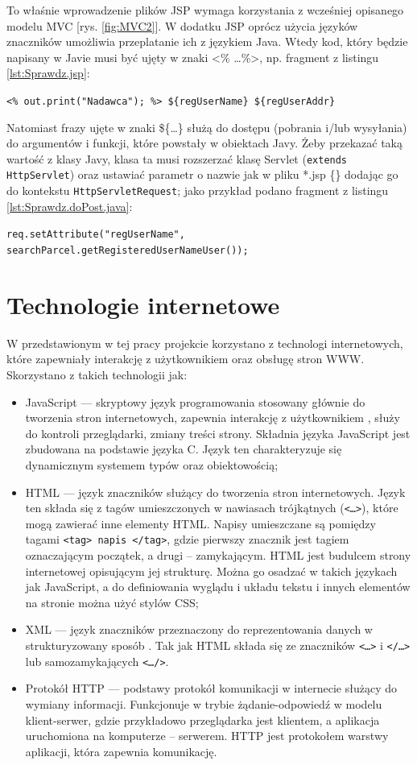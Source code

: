 \documentclass[eng,printmode,oneside]{mgr}
\begin{document}
To właśnie wprowadzenie plików JSP wymaga korzystania z wcześniej
opisanego modelu MVC [rys. \ref{fig:MVC2}]. W dodatku JSP oprócz użycia języków
znaczników umożliwia przeplatanie ich z językiem Java. Wtedy kod, który będzie
napisany w Javie musi być ujęty w znaki <\% \ldots \%>, np. fragment z listingu
\ref{lst:Sprawdz.jsp}:

\texttt{<\% out.print("Nadawca"); \%> \$\{regUserName\}
\$\{regUserAddr\}}

Natomiast frazy ujęte w znaki \$\{\ldots\} służą do dostępu (pobrania
i/lub wysyłania) do argumentów i funkcji, które powstały w obiektach Javy. Żeby
przekazać taką wartość z klasy Javy, klasa ta musi rozszerzać klasę Servlet
(\texttt{extends HttpServlet}) oraz ustawiać parametr o nazwie jak w pliku *.jsp
\{\} dodając go do kontekstu \texttt{HttpServletRequest}; jako przykład podano
fragment z listingu \ref{lst:Sprawdz.doPost.java}:

\texttt{req.setAttribute("regUserName",
						searchParcel.getRegisteredUserNameUser());}

\section{Technologie internetowe}

W przedstawionym w tej pracy projekcie korzystano z technologi internetowych,
które zapewniały interakcję z użytkownikiem oraz obsługę stron WWW. Skorzystano
z takich technologii jak:
\begin{itemize}
  \item JavaScript --- skryptowy język programowania stosowany głównie do
  tworzenia stron internetowych, zapewnia interakcję z
  użytkownikiem \cite{javascript.dev}, służy do kontroli przeglądarki, zmiany
  treści strony. Składnia języka JavaScript jest zbudowana na podstawie języka
  C. Język ten charakteryzuje się dynamicznym systemem typów oraz obiektowością;
  \item HTML --- język znaczników służący do tworzenia stron
  internetowych. Język ten składa się z tagów umieszczonych w
  nawiasach trójkątnych (\texttt{<\ldots>}), które mogą zawierać inne
  elementy HTML. Napisy umieszczane są pomiędzy tagami \texttt{<tag> napis
  </tag>}, gdzie pierwszy znacznik jest tagiem oznaczającym początek, a drugi -- zamykającym.
  HTML jest budulcem strony internetowej opisującym jej strukturę.
  Można go osadzać w takich językach jak JavaScript, a do definiowania wyglądu i
  układu tekstu i innych elementów na stronie można użyć stylów CSS;
  \item XML --- język znaczników przeznaczony do reprezentowania danych w
  strukturyzowany sposób \cite{xml.wiki}. Tak jak HTML składa się ze znaczników
  \texttt{<\ldots>} i \texttt{</\ldots>} lub samozamykających
  \texttt{<\ldots/>}.
  \item Protokół HTTP --- podstawy protokół komunikacji w internecie służący
  do wymiany informacji. Funkcjonuje w trybie żądanie-odpowiedź w modelu
  klient-serwer, gdzie przykładowo przeglądarka jest klientem, a aplikacja
  uruchomiona na komputerze -- serwerem. HTTP jest protokołem warstwy aplikacji,
  która zapewnia komunikację.
\end{itemize}
\end{document}
